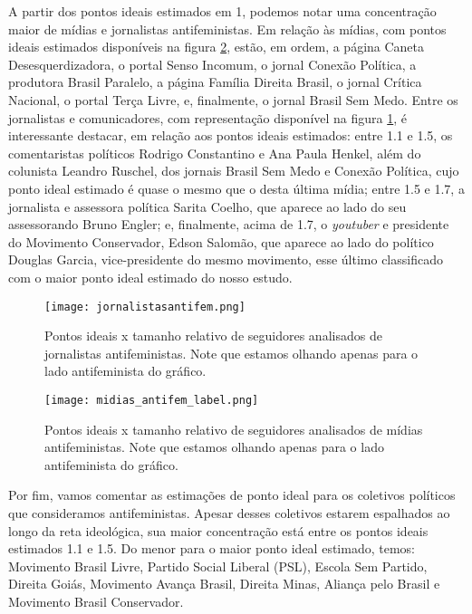 \documentclass[
	12pt,				%
	openright,			%
	twoside,			%
	a4paper,			%
	english,			%
	brazil				%
	]{abntex2}
\begin{document}
 A partir dos pontos ideais estimados em 1, podemos notar uma concentração maior de mídias e jornalistas antifeministas. Em relação às mídias, com pontos ideais estimados disponíveis na figura \ref{midiasantifem}, estão, em ordem, a página Caneta Desesquerdizadora, o portal Senso Incomum, o jornal Conexão Política, a produtora Brasil Paralelo, a página Família Direita Brasil, o jornal Crítica Nacional, o portal Terça Livre, e, finalmente, o jornal Brasil Sem Medo. Entre os jornalistas e comunicadores, com representação disponível na figura \ref{jornalistasantifem}, é interessante destacar, em relação aos pontos ideais estimados: entre 1.1 e 1.5, os comentaristas políticos Rodrigo Constantino e Ana Paula Henkel, além do colunista Leandro Ruschel, dos jornais Brasil Sem Medo e Conexão Política, cujo ponto ideal estimado é quase o mesmo que o desta última mídia; entre 1.5 e 1.7, a jornalista e assessora política Sarita Coelho, que aparece ao lado do seu assessorando Bruno Engler; e, finalmente, acima de 1.7, o \textit{youtuber} e presidente do Movimento Conservador, Edson Salomão, que aparece ao lado do político Douglas Garcia, vice-presidente do mesmo movimento, esse último classificado com o maior ponto ideal estimado do nosso estudo.

 \begin{figure}[!htbp]
    \centering
    \texttt{[image: jornalistasantifem.png]}
    \caption{Pontos ideais x tamanho relativo de seguidores analisados de jornalistas antifeministas. Note que estamos olhando apenas para o lado antifeminista do gráfico.}
    \label{jornalistasantifem}
 \end{figure}

 \begin{figure}[!htbp]
    \centering
    \texttt{[image: midias\_antifem\_label.png]}
    \caption{Pontos ideais x tamanho relativo de seguidores analisados de mídias antifeministas. Note que estamos olhando apenas para o lado antifeminista do gráfico.}
    \label{midiasantifem}
 \end{figure}
 
 Por fim, vamos comentar as estimações de ponto ideal para os coletivos políticos que consideramos antifeministas. Apesar desses coletivos estarem espalhados ao longo da reta ideológica, sua maior concentração está entre os pontos ideais estimados 1.1 e 1.5. Do menor para o maior ponto ideal estimado, temos: Movimento Brasil Livre, Partido Social Liberal (PSL), Escola Sem Partido, Direita Goiás, Movimento Avança Brasil, Direita Minas, Aliança pelo Brasil e Movimento Brasil Conservador.
\end{document}

